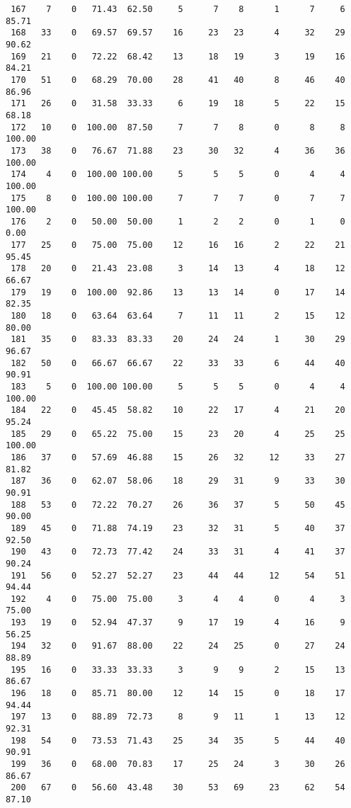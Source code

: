 \begin{verbatim}
 167    7    0   71.43  62.50     5      7    8      1      7     6    85.71
 168   33    0   69.57  69.57    16     23   23      4     32    29    90.62
 169   21    0   72.22  68.42    13     18   19      3     19    16    84.21
 170   51    0   68.29  70.00    28     41   40      8     46    40    86.96
 171   26    0   31.58  33.33     6     19   18      5     22    15    68.18
 172   10    0  100.00  87.50     7      7    8      0      8     8   100.00
 173   38    0   76.67  71.88    23     30   32      4     36    36   100.00
 174    4    0  100.00 100.00     5      5    5      0      4     4   100.00
 175    8    0  100.00 100.00     7      7    7      0      7     7   100.00
 176    2    0   50.00  50.00     1      2    2      0      1     0     0.00
 177   25    0   75.00  75.00    12     16   16      2     22    21    95.45
 178   20    0   21.43  23.08     3     14   13      4     18    12    66.67
 179   19    0  100.00  92.86    13     13   14      0     17    14    82.35
 180   18    0   63.64  63.64     7     11   11      2     15    12    80.00
 181   35    0   83.33  83.33    20     24   24      1     30    29    96.67
 182   50    0   66.67  66.67    22     33   33      6     44    40    90.91
 183    5    0  100.00 100.00     5      5    5      0      4     4   100.00
 184   22    0   45.45  58.82    10     22   17      4     21    20    95.24
 185   29    0   65.22  75.00    15     23   20      4     25    25   100.00
 186   37    0   57.69  46.88    15     26   32     12     33    27    81.82
 187   36    0   62.07  58.06    18     29   31      9     33    30    90.91
 188   53    0   72.22  70.27    26     36   37      5     50    45    90.00
 189   45    0   71.88  74.19    23     32   31      5     40    37    92.50
 190   43    0   72.73  77.42    24     33   31      4     41    37    90.24
 191   56    0   52.27  52.27    23     44   44     12     54    51    94.44
 192    4    0   75.00  75.00     3      4    4      0      4     3    75.00
 193   19    0   52.94  47.37     9     17   19      4     16     9    56.25
 194   32    0   91.67  88.00    22     24   25      0     27    24    88.89
 195   16    0   33.33  33.33     3      9    9      2     15    13    86.67
 196   18    0   85.71  80.00    12     14   15      0     18    17    94.44
 197   13    0   88.89  72.73     8      9   11      1     13    12    92.31
 198   54    0   73.53  71.43    25     34   35      5     44    40    90.91
 199   36    0   68.00  70.83    17     25   24      3     30    26    86.67
 200   67    0   56.60  43.48    30     53   69     23     62    54    87.10

\end{verbatim}

